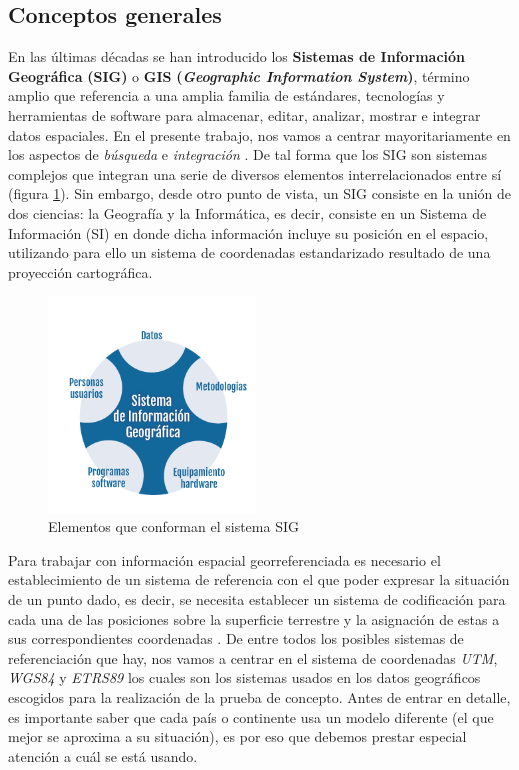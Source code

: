 

\subsection{Conceptos generales}

En las últimas décadas se han introducido los \textbf{Sistemas de Información Geográfica} \textbf{(SIG)} o \textbf{GIS} \textbf{(\textit{Geographic Information System})}, término amplio que referencia a una amplia familia de estándares, tecnologías y herramientas de software para almacenar, editar, analizar, mostrar e integrar datos espaciales. En el presente trabajo, nos vamos a centrar mayoritariamente en los aspectos de \textit{búsqueda} e \textit{integración} \cite{tesis}. De tal forma que los SIG son sistemas complejos que integran una serie de diversos elementos interrelacionados entre sí \cite{VictorOlaya} (figura \ref{fig:elementosSIG}). Sin embargo, desde otro punto de vista, un SIG consiste en la unión de dos ciencias: la Geografía y la Informática, es decir, consiste en un Sistema de Información (SI) en donde dicha información incluye su posición en el espacio, utilizando para ello un sistema de coordenadas estandarizado resultado de una proyección cartográfica. 

\begin{figure}[H]
	\centering
	\includegraphics[width=0.49\textwidth]{imagenes/capitulo2/graficoSig}
	\caption{Elementos que conforman el sistema SIG \cite{image-capitulo2}}
	\label{fig:elementosSIG}
\end{figure}

Para trabajar con información espacial georreferenciada es necesario el establecimiento de un sistema de referencia con el que poder expresar la situación de un punto dado, es decir, se necesita establecer un sistema de codificación para cada una de las posiciones sobre la superficie terrestre y la asignación de estas a sus correspondientes coordenadas \cite{VictorOlaya}. De entre todos los posibles sistemas de referenciación que hay, nos vamos a centrar en el sistema de coordenadas \textit{UTM}, \textit{WGS84} y \textit{ETRS89}  los cuales son los sistemas usados en los datos geográficos escogidos para la realización de la prueba de concepto. Antes de entrar en detalle, es importante saber que cada país o continente usa un modelo diferente (el que mejor se aproxima a su situación), es por eso que debemos prestar especial atención a cuál se está usando. 

